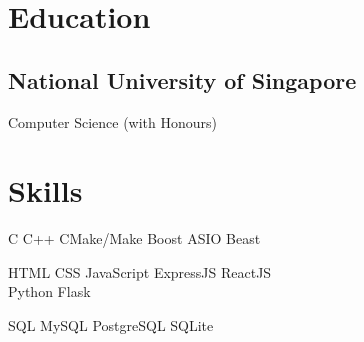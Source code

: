 \documentclass[a4paper,hidelinks]{resume} %
\begin{document}
\begin{minipage}[t]{0.49\textwidth} %

    
    \section{Education}
    
    \sectionspace %
    
    \subsection{National University of Singapore}
    
     {Computer Science (with Honours)} \\
    
    \sectionspace %
    
    
    \section{Skills}
    
    \sectionspace %
    
    
    C \textbullet{} C++ \textbullet{} CMake/Make \textbullet{} Boost \textbullet{} ASIO \textbullet{} Beast \\
    
    
    HTML \textbullet{} CSS \textbullet{} JavaScript \textbullet{} ExpressJS \textbullet{} ReactJS \\ \textbullet{} Python \textbullet{} Flask\\
    
    
    SQL \textbullet{} MySQL \textbullet{} PostgreSQL \textbullet{} SQLite \\
    

\end{minipage}
\end{document}
